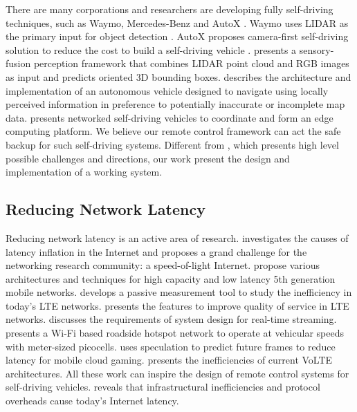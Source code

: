 There are many corporations and researchers are developing fully self-driving
techniques, such as Waymo, Mercedes-Benz and AutoX \cite{waymo, benz, autox}.
Waymo uses LIDAR as the primary input for object detection \cite{waymo}. 
AutoX proposes camera-first self-driving solution to reduce
the cost to build a self-driving vehicle \cite{autox}.  
\cite{cvpr17chen} presents a sensory-fusion perception framework 
that combines LIDAR point cloud and RGB images as input and 
predicts oriented 3D bounding boxes. 
\cite{leonard2008perception} describes the architecture and implementation 
of an autonomous vehicle designed to navigate using locally perceived 
information in preference to potentially inaccurate or incomplete map data. 
\cite{lee2016internet} presents networked self-driving vehicles to coordinate 
and form an edge computing platform. 
We believe our remote control framework can act the safe backup
for such self-driving systems.
Different from \cite{kang2018rc}, which presents high level possible 
challenges and directions, 
our work present the design and implementation of a working system.  


\subsection{Reducing Network Latency}

Reducing network latency is an active area of research. 
\cite{singla2014internet} investigates the causes of latency inflation in the
Internet and proposes a grand challenge for the networking research 
community: a speed-of-light Internet. 
\cite{zhang20145g, agiwal2016next} propose various architectures and techniques
for high capacity and low latency 5th generation mobile networks. 
\cite{huang2013depth} develops a passive measurement tool to 
study the inefficiency in today's LTE networks. 
\cite{ali2013quality} presents the features to improve
quality of service in LTE networks. 
\cite{stonebraker20058} discusses the requirements of system
design for real-time streaming. 
\cite{song2017wifi} presents a Wi-Fi based roadside hotspot network to
operate at vehicular speeds with meter-sized picocells.
\cite{lee2015outatime} uses speculation to predict future frames to reduce 
latency for mobile cloud gaming.
\cite{tu2016volte} presents the inefficiencies of current VoLTE architectures. 
All these work can inspire the design of remote control systems for self-driving vehicles.
\cite{singla2014internet} reveals that
infrastructural inefficiencies and protocol
overheads cause today's Internet latency. 



